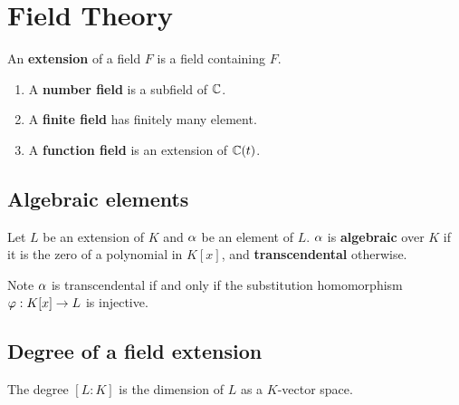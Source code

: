 \chapter{Field Theory}
An \textbf{extension} of a field $F$ is a field containing $F$.
\begin{enumerate}
\item
A \textbf{number field} is a subfield of $\mathbb{C}$.
\item
A \textbf{finite field} has finitely many element.
\item
A \textbf{function field} is an extension of $\mathbb{C}(t)$.
\end{enumerate}

\section{Algebraic elements}
\begin{df}
Let $L$ be an extension of $K$ and $\alpha$ be an element of $L$. $\alpha$ is \textbf{algebraic} over $K$ if it is the zero of a polynomial in $K[x]$, and \textbf{transcendental} otherwise.
\end{df}
Note $\alpha$ is transcendental if and only if the substitution homomorphism $\varphi:K[x]\to L$ is injective.

\section{Degree of a field extension}
\begin{df}
The degree $[L:K]$ is the dimension of $L$ as a $K$-vector space.
\end{df}
